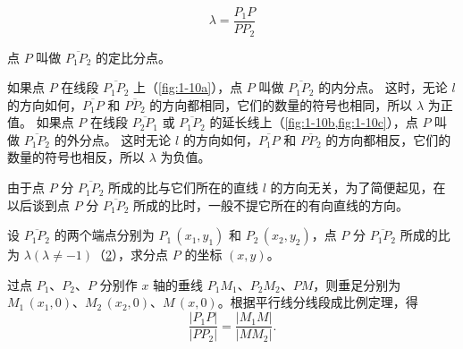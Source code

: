 \[ \lambda = \frac{P_1P}{PP_2} \]

点 $P$ 叫做 $\overline{P_1P_2}$ 的定比分点。

如果点 $P$ 在线段 $\overline{P_1P_2}$ 上（\cref{fig:1-10a}），点 \(P\) 叫做 \(\overline{{P}_{1}{P}_{2}}\) 的内分点。
这时，无论 $l$ 的方向如何，$\overline{P_1P}$ 和 $\overline{PP_2}$ 的方向都相同，它们的数量的符号也相同，所以 $\lambda$ 为正值。
如果点 $P$ 在线段 $\overline{P_2P_1}$ 或 $\overline{P_1P_2}$ 的延长线上（\cref{fig:1-10b,fig:1-10c}），点 $P$ 叫做 $\overline{P_1P_2}$ 的外分点。
这时无论 $l$ 的方向如何，$\overline{P_1P}$ 和 $\overline{PP_2}$ 的方向都相反，它们的数量的符号也相反，所以 $\lambda$ 为负值。
\begin{figure}
  \begin{minipage}{0.1\linewidth}
    \subcaption{}\label{fig:1-10a}
  \end{minipage}%
  \begin{minipage}{0.7\linewidth}

  \end{minipage}\par
  \begin{minipage}{0.1\linewidth}
    \subcaption{}\label{fig:1-10b}
  \end{minipage}%
  \begin{minipage}{0.7\linewidth}

  \end{minipage}\par
  \begin{minipage}{0.1\linewidth}
    \subcaption{}\label{fig:1-10c}
  \end{minipage}%
  \begin{minipage}{0.7\linewidth}

  \end{minipage}
  \caption{}\label{fig:1-10}
\end{figure}

由于点 $P$ 分 $\overline{P_1P_2}$ 所成的比与它们所在的直线 $l$ 的方向无关，为了简便起见，在以后谈到点 $P$ 分 $\overline{P_1P_2}$ 所成的比时，一般不提它所在的有向直线的方向。

设 $\overline{P_1P_2}$ 的两个端点分别为 $P_1\,(x_1,y_1)$ 和 $P_2\,(x_2,y_2)$，点 $P$ 分 $\overline{P_1P_2}$ 所成的比为 $\lambda(\lambda\neq-1)$（\cref{fig:1-11}），求分点 $P$ 的坐标 $(x,y)$。

\begin{figure}
  \caption{}\label{fig:1-11}
\end{figure}

过点 $P_1$、$P_2$、$P$ 分别作 $x$ 轴的垂线 $P_1M_1$、$P_2M_2$、$PM$，则垂足分别为 $M_1\,(x_1,0)$、$M_2\,(x_2,0)$、$M\,(x,0)$。根据平行线分线段成比例定理，得
\[ \frac{|P_1P|}{|PP_2|}=\frac{|M_1M|}{|MM_2|}. \]

